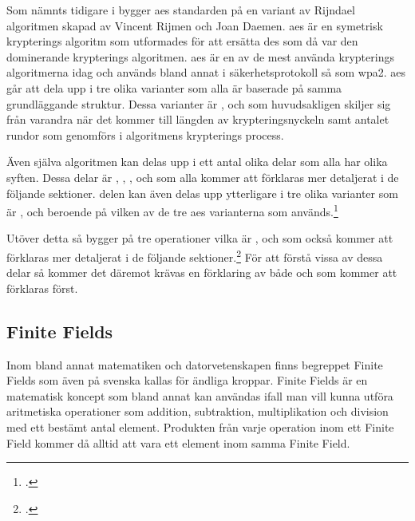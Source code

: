 Som nämnts tidigare i  bygger \acrshort{aes} standarden på en variant av Rijndael  algoritmen
skapad av Vincent Rijmen och Joan Daemen. \acrshort{aes} är en symetrisk  krypterings algoritm som utformades för att ersätta
\acrshort{des} som då var den dominerande krypterings algoritmen. \acrshort{aes} är en av de mest använda krypterings algoritmerna idag
och används bland annat i säkerhetsprotokoll så som \acrfull{wpa2}. \acrshort{aes} går att dela upp i tre olika varianter
som alla är baserade på samma grundläggande struktur. Dessa varianter är ,  och  som huvudsakligen
skiljer sig från varandra när det kommer till längden av krypteringsnyckeln samt antalet rundor som genomförs i algoritmens krypterings process.

Även själva algoritmen kan delas upp i ett antal olika delar som alla har olika syften. Dessa delar är , , ,
 och  som alla kommer att förklaras mer detaljerat i de följande sektioner.  delen kan även
delas upp ytterligare i tre olika varianter som är ,  och  beroende
på vilken av de tre \acrshort{aes} varianterna som används.\footcite{aes_wiki}

Utöver detta så bygger  på tre operationer vilka är ,  och
 som också kommer att förklaras mer detaljerat i de följande sektioner.\footcite{aes_wiki} För att förstå vissa av dessa delar
så kommer det däremot krävas en förklaring av både  och  som kommer att förklaras först.

\subsection{Finite Fields}
\label{sec:finite-fields}
Inom bland annat matematiken och datorvetenskapen finns begreppet Finite Fields
som även på svenska kallas för ändliga kroppar. Finite Fields är en matematisk
koncept som bland annat kan användas ifall man vill kunna utföra aritmetiska
operationer som addition, subtraktion, multiplikation och division med ett
bestämt antal element. Produkten från varje operation inom ett Finite Field
kommer då alltid att vara ett element inom samma Finite Field.

